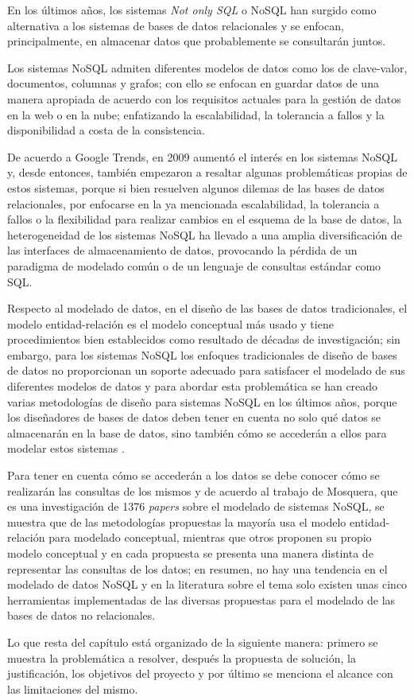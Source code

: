En los últimos años, los sistemas \textit{Not only SQL} o NoSQL han surgido como alternativa a los sistemas de bases de datos relacionales y se enfocan, principalmente, en almacenar datos que probablemente se consultarán juntos.


Los sistemas NoSQL admiten diferentes modelos de datos como los de clave-valor, documentos, columnas y grafos; con ello se enfocan en guardar datos de una manera apropiada de acuerdo con los requisitos actuales para la gestión de datos en la web o en la nube; enfatizando la escalabilidad, la tolerancia a fallos y la disponibilidad a costa de la consistencia.



De acuerdo a Google Trends\cite{google_google_2020}, en 2009 aumentó el interés en los sistemas NoSQL y, desde entonces, también empezaron a resaltar algunas problemáticas propias de estos sistemas, porque si bien resuelven algunos dilemas de las bases de datos relacionales, por enfocarse en la ya mencionada escalabilidad, la tolerancia a fallos o la flexibilidad para realizar cambios en el esquema de la base de datos, la heterogeneidad de los sistemas NoSQL ha llevado a una amplia diversificación de las interfaces de almacenamiento de datos, provocando la pérdida de un paradigma de modelado común o de un lenguaje de consultas estándar como SQL.


Respecto al modelado de datos, en el diseño de las bases de datos tradicionales, el modelo entidad-relación\cite{codd_relational_nodate} es el modelo conceptual más usado y tiene procedimientos bien establecidos como resultado de décadas de investigación; sin embargo, para los sistemas NoSQL los enfoques tradicionales de diseño de bases de datos no proporcionan un soporte adecuado para satisfacer el modelado de sus diferentes modelos de datos y para abordar esta problemática se han creado varias metodologías de diseño para sistemas NoSQL en los últimos años, porque los diseñadores de bases de datos deben tener en cuenta no solo qué datos se almacenarán en la base de datos, sino también cómo se accederán a ellos para modelar estos sistemas \cite{li_transforming_2010,chebotko_big_2015,mior_nose_2017}. 


Para tener en cuenta cómo se accederán a los datos se debe conocer cómo se realizarán las consultas de los mismos y de acuerdo al trabajo de Mosquera\cite{martinez-mosquera_modeling_2020}, que es una investigación de 1376 \textit{papers} sobre el modelado de sistemas NoSQL, se muestra que de las metodologías propuestas la mayoría usa el modelo entidad-relación para modelado conceptual, mientras que otros proponen su propio modelo conceptual y en cada propuesta se presenta una manera distinta de representar las consultas de los datos; en resumen, no hay una tendencia en el modelado de datos NoSQL y en la literatura sobre el tema solo existen unas cinco herramientas implementadas de las diversas propuestas para el modelado de las bases de datos no relacionales.


Lo que resta del capítulo está organizado de la siguiente manera: primero se muestra la problemática a resolver, después la propuesta de solución, la justificación, los objetivos del proyecto y por último se menciona el alcance con las limitaciones del mismo.